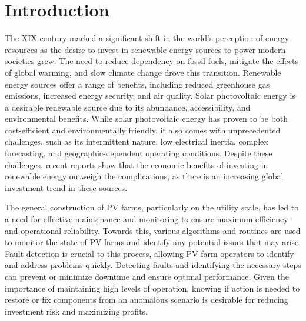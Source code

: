 \chapter{Introduction} \label{chap:chap1}


The XIX century marked a significant shift in the world's perception of energy resources as the desire to invest in renewable energy sources to power modern societies grew. The need to reduce dependency on fossil fuels, mitigate the effects of global warming, and slow climate change drove this transition. Renewable energy sources offer a range of benefits, including reduced greenhouse gas emissions, increased energy security, and air quality. Solar photovoltaic energy is a desirable renewable source due to its abundance, accessibility, and environmental benefits. While solar photovoltaic energy has proven to be both cost-efficient and environmentally friendly, it also comes with unprecedented challenges, such as its intermittent nature, low electrical inertia, complex forecasting, and geographic-dependent operating conditions. Despite these challenges, recent reports \cite{cap} show that the economic benefits of investing in renewable energy outweigh the complications, as there is an increasing global investment trend in these sources.

The general construction of PV farms, particularly on the utility scale, has led to a need for effective maintenance and monitoring to ensure maximum efficiency and operational reliability. Towards this, various algorithms and routines are used to monitor the state of PV farms and identify any potential issues that may arise. Fault detection is crucial to this process, allowing PV farm operators to identify and address problems quickly. Detecting faults and identifying the necessary steps can prevent or minimize downtime and ensure optimal performance. Given the importance of maintaining high levels of operation, knowing if action is needed to restore or fix components from an anomalous scenario is desirable for reducing investment risk and maximizing profits.

